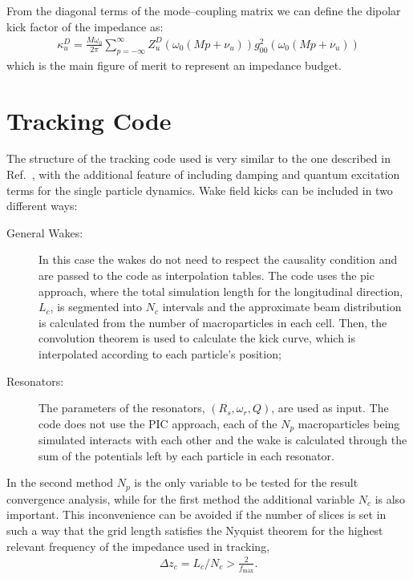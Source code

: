     From the diagonal terms of the mode--coupling matrix we can define the dipolar kick factor of the impedance as:
    \begin{align}
        \kappa_u^D = \frac{M\omega_0}{2\pi}\sum_{p=-\infty}^{\infty}
            Z_u^D(\omega_0(Mp + \nu_u)) g_{00}^2(\omega_0(Mp + \nu_u))
    \end{align}
    which is the main figure of merit to represent an impedance budget.


\section{Tracking Code}\label{sec:tracking_code}

    The structure of the tracking code used is very similar to the one described in Ref.~, with the additional feature of including damping and quantum excitation terms for the single particle dynamics. Wake field kicks can be included in two different ways:
    \begin{description}
        \item[General Wakes:] In this case the wakes do not need to respect the causality condition and are passed to the code as interpolation tables. The code uses the \gls{pic} approach, where the total simulation length for the longitudinal direction, $L_c$, is segmented into $N_c$ intervals and the approximate beam distribution is calculated from the number of macroparticles in each cell. Then, the convolution theorem is used to calculate the kick curve\cite{Bassi2016}, which is interpolated according to each particle's position;
        \item[Resonators:] The parameters of the resonators, $(R_s, \omega_r, Q)$, are used as input. The code does not use the PIC approach, each of the $N_p$ macroparticles being simulated interacts with each other and the wake is calculated through the sum of the potentials left by each particle in each resonator.
    \end{description}

    In the second method $N_p$ is the only variable to be tested for the result convergence analysis, while for the first method the additional variable $N_c$ is also important. This inconvenience can be avoided if the number of slices is set in such a way that the grid length satisfies the Nyquist theorem for the highest relevant frequency of the impedance used in tracking,
    \begin{align} \label{eq:nyquist_theorem}
        \Delta z_c = L_c/N_c > \frac{2}{f_\text{max}}.
    \end{align}

